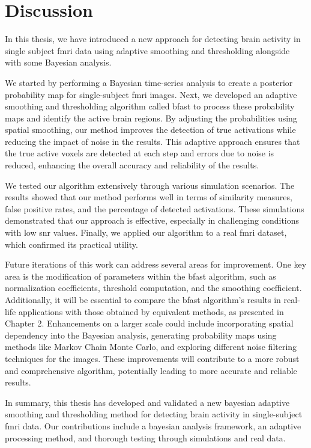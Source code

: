 \chapter{Discussion}

In this thesis, we have introduced a new approach for detecting brain activity 
in single subject \gls{fmri} data using adaptive smoothing and 
thresholding alongside with some Bayesian analysis.

We started by performing a Bayesian time-series analysis to create a 
posterior probability map for single-subject \gls{fmri} images. Next, we developed 
an adaptive smoothing and thresholding algorithm called \gls{bfast} to process these probability 
maps and identify the active brain regions. By adjusting the probabilities using spatial 
smoothing, our method improves the detection of true activations while reducing 
the impact of noise in the results. This adaptive approach ensures that the true 
active voxels are detected at each step and errors due to noise is reduced, enhancing 
the overall accuracy and reliability of the results.

We tested our algorithm extensively through various simulation scenarios. 
The results showed that our method performs well in terms of similarity 
measures, false positive rates, and the percentage of detected activations. 
These simulations demonstrated that our approach is effective, 
especially in challenging conditions with low \gls{snr} values. Finally, we applied our 
algorithm to a real \gls{fmri} dataset, which confirmed 
its practical utility.

Future iterations of this work can address several areas for improvement. One key 
area is the modification of parameters within the \gls{bfast} algorithm, such as 
normalization coefficients, threshold computation, and the smoothing coefficient. 
Additionally, it will be essential to compare the \gls{bfast} algorithm's results 
in real-life applications with those obtained by equivalent methods, as presented 
in Chapter 2. Enhancements on a larger scale could include incorporating spatial 
dependency into the Bayesian analysis, generating probability maps using methods 
like Markov Chain Monte Carlo, and exploring different noise filtering techniques 
for the images. These improvements will contribute to a more robust and comprehensive 
algorithm, potentially leading to more accurate and reliable results.

In summary, this thesis has developed and validated a new bayesian adaptive 
smoothing and thresholding method for detecting brain activity in single-subject 
\gls{fmri} data. Our contributions include a bayesian analysis framework, 
an adaptive processing method, and thorough testing through simulations and 
real data.
